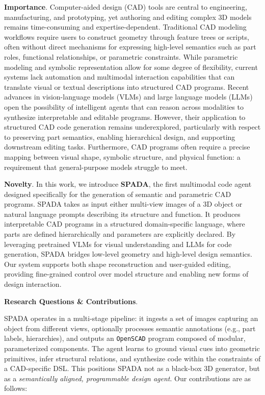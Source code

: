 \documentclass[doubleblind]{ecai}
\begin{document}
\textbf{Importance}. Computer-aided design (CAD) tools are central to engineering, manufacturing, and prototyping, yet authoring and editing complex 3D models remains time-consuming and expertise-dependent. Traditional CAD modeling workflows require users to construct geometry through feature trees or scripts, often without direct mechanisms for expressing high-level semantics such as part roles, functional relationships, or parametric constraints. While parametric modeling and symbolic representation allow for some degree of flexibility, current systems lack automation and multimodal interaction capabilities that can translate visual or textual descriptions into structured CAD programs. Recent advances in vision-language models (VLMs) and large language models (LLMs) open the possibility of intelligent agents that can reason across modalities to synthesize interpretable and editable programs. However, their application to structured CAD code generation remains underexplored, particularly with respect to preserving part semantics, enabling hierarchical design, and supporting downstream editing tasks. Furthermore, CAD programs often require a precise mapping between visual shape, symbolic structure, and physical function: a requirement that general-purpose models struggle to meet.

\textbf{Novelty}. In this work, we introduce \textbf{SPADA}, the first multimodal code agent designed specifically for the generation of semantic and parametric CAD programs. SPADA takes as input either multi-view images of a 3D object or natural language prompts describing its structure and function. It produces interpretable CAD programs in a structured domain-specific language, where parts are defined hierarchically and parameters are explicitly declared. By leveraging pretrained VLMs for visual understanding and LLMs for code generation, SPADA bridges low-level geometry and high-level design semantics. Our system supports both shape reconstruction and user-guided editing, providing fine-grained control over model structure and enabling new forms of design interaction.

\textbf{Research Questions \& Contributions}.

SPADA operates in a multi-stage pipeline: it ingests a set of images capturing an object from different views, optionally processes semantic annotations (e.g., part labels, hierarchies), and outputs an \texttt{OpenSCAD} program composed of modular, parameterized components. The agent learns to ground visual cues into geometric primitives, infer structural relations, and synthesize code within the constraints of a CAD-specific DSL. This positions SPADA not as a black-box 3D generator, but as a \emph{semantically aligned, programmable design agent}. Our contributions are as follows:
\end{document}
